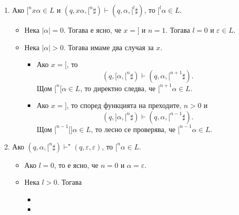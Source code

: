 \begin{example}
  \begin{enumerate}[(1)]
  \item 
    Ако $\texttt{[}^nx\alpha \in L$ и
    $(q, x\alpha, \texttt{[}^n\sharp) \vdash (q, \alpha, \texttt{[}^{l}\sharp)$,
    то $\texttt{[}^l\alpha \in L$.
    \begin{itemize}
    \item 
      Нека $|\alpha| = 0$. Тогава е ясно, че $x = \texttt{]}$ и $n = 1$.
      Тогава $l = 0$ и $\varepsilon \in L$.
    \item 
      Нека $|\alpha| > 0$. Тогава имаме два случая за $x$.
      \begin{itemize}
      \item 
        Ако $x = \texttt{[}$, то 
        \[(q, \texttt{[}\alpha, \texttt{[}^n\sharp) \vdash (q, \alpha, \texttt{[}^{n+1}\sharp).\]
        Щом $\texttt{[}^n\texttt{[}\alpha \in L$, то директно следва, че $\texttt{[}^{n+1}\alpha \in L$.
      \item
        Ако $x = \texttt{]}$, то според функцията на преходите, $n > 0$ и 
        \[(q, \texttt{]}\alpha, \texttt{[}^n\sharp) \vdash (q, \alpha, \texttt{[}^{n-1}\sharp).\]
        Щом $\texttt{[}^{n-1}\texttt{[}\texttt{]}\alpha \in L$, то лесно се проверява, че $\texttt{[}^{n-1}\alpha \in L$.
      \end{itemize}
    \end{itemize}
  \item
    Ако $(q,\alpha,\texttt{[}^n\sharp) \vdash^\star (q,\varepsilon,\varepsilon)$,
    то $\texttt{[}^n\alpha \in L$.
    \begin{itemize}
    \item 
      Ако $l = 0$, то е ясно, че $n = 0$ и $\alpha = \varepsilon$.
    \item
      Нека $l > 0$. Тогава
      \begin{itemize}
      \item 
        
      \item

      \end{itemize}
    \end{itemize}
  \end{enumerate}

\end{example}


